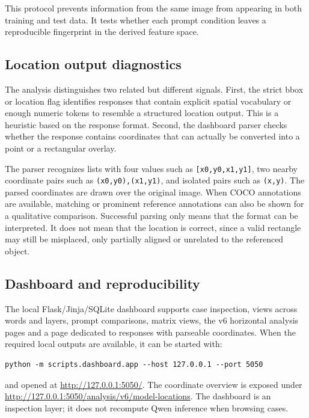 \documentclass[11pt,a4paper]{article}
\newcommand{\code}[1]{\texttt{\small #1}}
\begin{document}
This protocol prevents information from the same image from appearing in both training and test data. It tests whether each prompt condition leaves a reproducible fingerprint in the derived feature space.

\subsection{Location output diagnostics}

The analysis distinguishes two related but different signals. First, the strict bbox or location flag identifies responses that contain explicit spatial vocabulary or enough numeric tokens to resemble a structured location output. This is a heuristic based on the response format. Second, the dashboard parser checks whether the response contains coordinates that can actually be converted into a point or a rectangular overlay.

The parser recognizes lists with four values such as \code{[x0,y0,x1,y1]}, two nearby coordinate pairs such as \code{(x0,y0),(x1,y1)}, and isolated pairs such as \code{(x,y)}. The parsed coordinates are drawn over the original image. When COCO annotations are available, matching or prominent reference annotations can also be shown for a qualitative comparison. Successful parsing only means that the format can be interpreted. It does not mean that the location is correct, since a valid rectangle may still be misplaced, only partially aligned or unrelated to the referenced object.

\subsection{Dashboard and reproducibility}

The local Flask/Jinja/SQLite dashboard supports case inspection, views across words and layers, prompt comparisons, matrix views, the v6 horizontal analysis pages and a page dedicated to responses with parseable coordinates. When the required local outputs are available, it can be started with:

\begin{verbatim}
python -m scripts.dashboard.app --host 127.0.0.1 --port 5050
\end{verbatim}

and opened at \url{http://127.0.0.1:5050/}. The coordinate overview is exposed under \url{http://127.0.0.1:5050/analysis/v6/model-locations}. The dashboard is an inspection layer; it does not recompute Qwen inference when browsing cases.
\end{document}
